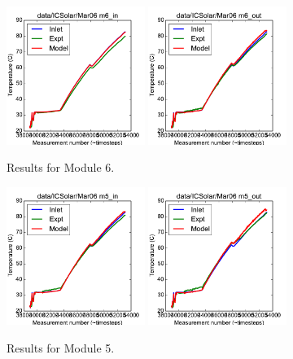 \documentclass{article}
\begin{document}
\begin{figure}[!ht]
\centering
\includegraphics[width=0.4\textwidth]{../../data/ICSolar/images/Mar06_m6_in_unsteady.pdf}\hspace{0.05\textwidth}
\includegraphics[width=0.4\textwidth]{../../data/ICSolar/images/Mar06_m6_out_unsteady.pdf}\hspace{0.05\textwidth}\\
\caption{Results for Module 6.}\end{figure}
\begin{figure}[!ht]
\centering
\includegraphics[width=0.4\textwidth]{../../data/ICSolar/images/Mar06_m5_in_unsteady.pdf}\hspace{0.05\textwidth}
\includegraphics[width=0.4\textwidth]{../../data/ICSolar/images/Mar06_m5_out_unsteady.pdf}\hspace{0.05\textwidth}\\
\caption{Results for Module 5.}\end{figure}
\end{document}
